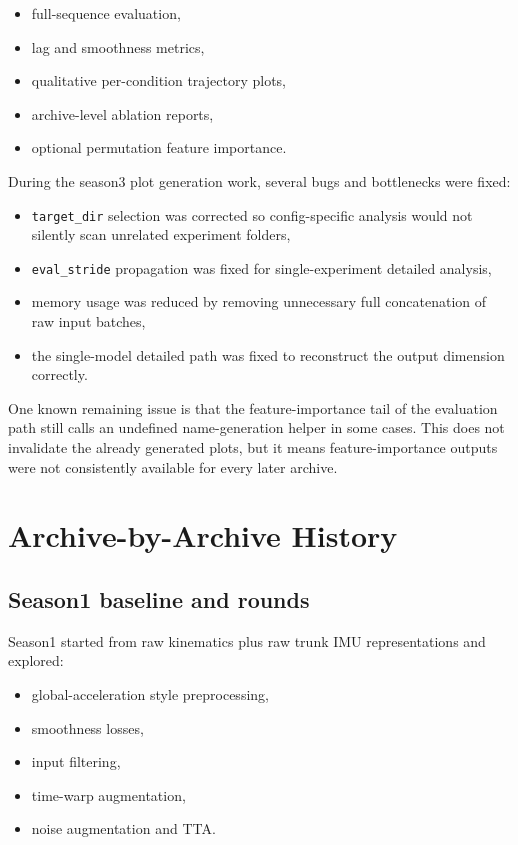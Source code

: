 \documentclass[11pt,a4paper]{article}
\begin{document}
\begin{itemize}
\item full-sequence evaluation,
\item lag and smoothness metrics,
\item qualitative per-condition trajectory plots,
\item archive-level ablation reports,
\item optional permutation feature importance.
\end{itemize}

During the season3 plot generation work, several bugs and bottlenecks were fixed:

\begin{itemize}
\item \texttt{target\_dir} selection was corrected so config-specific analysis would not silently scan unrelated experiment folders,
\item \texttt{eval\_stride} propagation was fixed for single-experiment detailed analysis,
\item memory usage was reduced by removing unnecessary full concatenation of raw input batches,
\item the single-model detailed path was fixed to reconstruct the output dimension correctly.
\end{itemize}

One known remaining issue is that the feature-importance tail of the evaluation path still calls an undefined name-generation helper in some cases. This does not invalidate the already generated plots, but it means feature-importance outputs were not consistently available for every later archive.

\section{Archive-by-Archive History}

\subsection{Season1 baseline and rounds}

Season1 started from raw kinematics plus raw trunk IMU representations and explored:

\begin{itemize}
\item global-acceleration style preprocessing,
\item smoothness losses,
\item input filtering,
\item time-warp augmentation,
\item noise augmentation and TTA.
\end{itemize}
\end{document}
